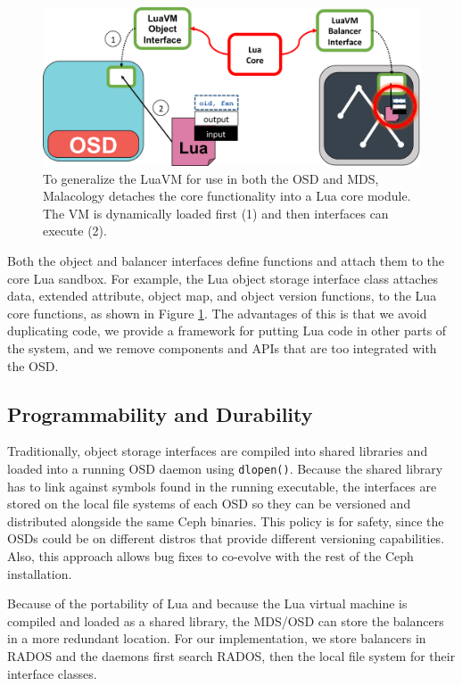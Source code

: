 \documentclass[10pt,twocolumn]{article}
\begin{document}
\begin{figure}[htbp]
\centering
\includegraphics{figures/cls-osd-mds.png}
\caption{To generalize the LuaVM for use in both the OSD and MDS,
Malacology detaches the core functionality into a Lua core module. The
VM is dynamically loaded first (1) and then interfaces can execute (2).
\label{fig:cls-osd-mds}}
\end{figure}

\iffalse
Both the object and balancer interfaces define functions and attach them
to the core Lua sandbox. For example, the Lua object storage interface
class attaches data, extended attribute, object map, and object version
functions, to the Lua core functions, as shown in Figure
\ref{fig:cls-osd-mds}. The advantages of this is that we avoid
duplicating code, we provide a framework for putting Lua code in other
parts of the system, and we remove components and APIs that are too
integrated with the OSD.

\subsection{Programmability and Durability}

Traditionally, object storage interfaces are compiled into shared
libraries and loaded into a running OSD daemon using \texttt{dlopen()}.
Because the shared library has to link against symbols found in the
running executable, the interfaces are stored on the local file systems
of each OSD so they can be versioned and distributed alongside the same
Ceph binaries. This policy is for safety, since the OSDs could be on
different distros that provide different versioning capabilities. Also,
this approach allows bug fixes to co-evolve with the rest of the Ceph
installation.

Because of the portability of Lua and because the Lua virtual machine is
compiled and loaded as a shared library, the MDS/OSD can store the
balancers in a more redundant location. For our implementation, we store
balancers in RADOS and the daemons first search RADOS, then the local
file system for their interface classes.
\end{document}
